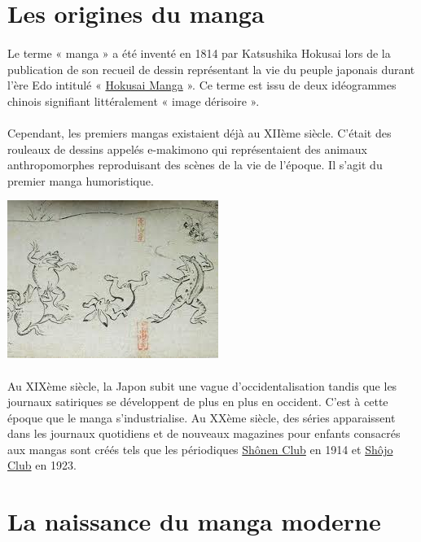 \section{Les origines du manga}

\paragraph{} Le terme « manga » a été inventé en 1814 par Katsushika Hokusai
lors de la publication de son recueil de dessin représentant la vie du peuple
japonais durant l’ère Edo intitulé « \underline{Hokusai Manga} ». Ce terme est
issu de deux idéogrammes chinois signifiant littéralement « image dérisoire ». 

\paragraph{} Cependant, les premiers mangas existaient déjà au XIIème  siècle.
C’était des rouleaux de dessins appelés e-makimono qui représentaient des
animaux anthropomorphes reproduisant des scènes de la vie de l’époque. Il
s’agit du premier manga humoristique.

\begin{center}
	\includegraphics[scale=0.7]{emakimono.jpg}
\end{center}

\paragraph{} Au XIXème siècle, la Japon subit une vague d’occidentalisation
tandis que les journaux satiriques se développent de plus en plus en occident.
C’est à cette époque que le manga s’industrialise. Au XXème siècle, des séries
apparaissent dans les journaux quotidiens et de nouveaux magazines pour enfants
consacrés aux mangas sont créés tels que les périodiques \underline{Shônen
Club} en 1914 et \underline{Shôjo Club} en 1923.

\section{La naissance du manga moderne}

